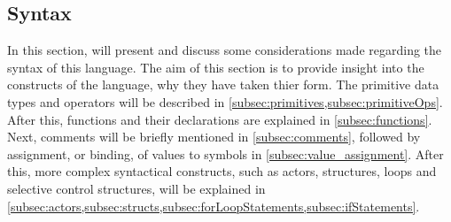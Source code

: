 \subsection{Syntax}
\label{sec:syntax}
In this section, will present and discuss some considerations made regarding the syntax of this language. The aim of this section is to provide insight into the constructs of the language, why they have taken thier form.
The primitive data types and operators will be described in \cref{subsec:primitives,subsec:primitiveOps}. After this, functions and their declarations are explained in \cref{subsec:functions}. Next, comments will be briefly mentioned in \cref{subsec:comments}, followed by assignment, or binding, of values to symbols in \cref{subsec:value_assignment}. After this, more complex syntactical constructs, such as actors, structures, loops and selective control structures, will be explained in \cref{subsec:actors,subsec:structs,subsec:forLoopStatements,subsec:ifStatements}.










